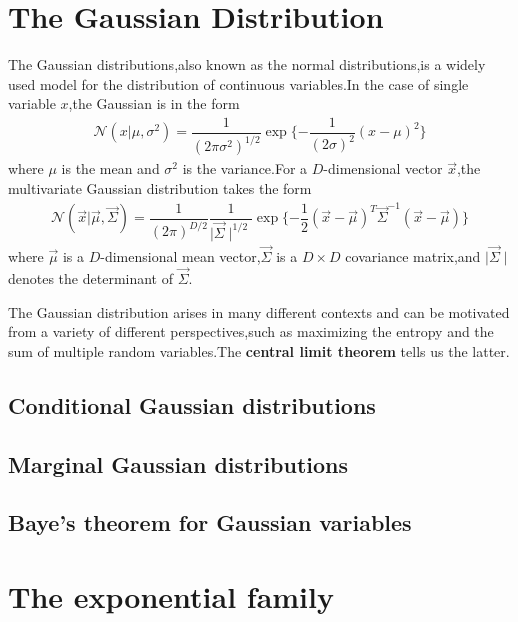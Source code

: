 \section{The Gaussian Distribution}
\label{sec:Gaussian distribution}
The Gaussian distributions,also known as the normal distributions,is a widely used model for the distribution of continuous variables.In the case of single variable $x$,the Gaussian is in the form
\begin{align}\label{eqn:univariate Gaussian distributions}
\mathcal{N}(x|\mu,\sigma^2)=\dfrac{1}{(2\pi\sigma^2)^{1/2}}\exp\{-\dfrac{1}{(2\sigma)^2}(x-\mu)^2 \}
\end{align}
where $\mu$ is the mean and $\sigma^2$ is the variance.For a $D$-dimensional vector $\vec{x}$,the multivariate Gaussian distribution takes the form
\begin{align}\label{eqn:multivariate Gaussian}
	\mathcal{N}(\vec{x}|\vec{\mu},\vec{\Sigma})
	=\dfrac{1}{(2\pi)^{D/2}}\dfrac{1}{\mid \vec{\Sigma}\mid^{1/2}}
	\exp\{-\dfrac{1}{2}(\vec{x}-\vec{\mu})^T\vec{\Sigma}^{-1}(\vec{x}-\vec{\mu}) \}
\end{align}
where $\vec{\mu}$ is a $D$-dimensional mean vector,$\vec{\Sigma}$ is a $D\times D$ covariance matrix,and $\mid\vec{\Sigma}\mid$ denotes the determinant of $\vec{\Sigma}$.

The Gaussian distribution arises in many different contexts and can be motivated from a variety of different perspectives,such as maximizing the entropy and the sum of multiple random variables.The \textbf{central limit theorem} tells us the latter.


\subsection{Conditional Gaussian distributions}
\subsection{Marginal Gaussian distributions}
\subsection{Baye's theorem for Gaussian variables}

\section{The exponential family}
\label{sec:exponential-family}

